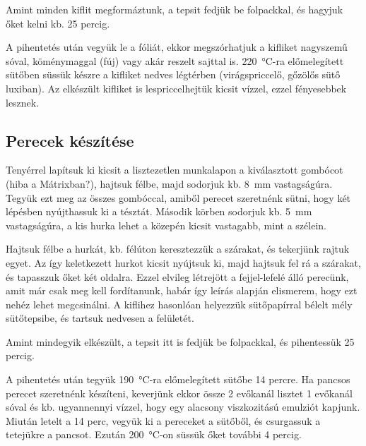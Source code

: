 Amint minden kiflit megformáztunk, a tepsit fedjük be folpackkal, és hagyjuk őket kelni kb. \num{25} percig.

A pihentetés után vegyük le a fóliát, ekkor megszórhatjuk a kifliket nagyszemű sóval, köménymaggal (fúj) vagy akár reszelt sajttal is. \qty{220}{\celsius}-ra előmelegített sütőben süssük készre a kifliket nedves légtérben (virágspriccelő, gőzölős sütő luxiban). Az elkészült kifliket is lespriccelhejtük kicsit vízzel, ezzel fényesebbek lesznek.~\cite{szabi_kifli}

\subsection*{Perecek készítése}
Tenyérrel lapítsuk ki kicsit a lisztezetlen munkalapon a kiválasztott gombócot (hiba a Mátrixban?), hajtsuk félbe, majd sodorjuk kb. \qty{8}{\mm} vastagságúra. Tegyük ezt meg az összes gombóccal, amiből perecet szeretnénk sütni, hogy két lépésben nyújthassuk ki a tésztát. Második körben sodorjuk kb. \qty{5}{\mm} vastagságúra, a kis hurka lehet a közepén kicsit vastagabb, mint a szélein.

Hajtsuk félbe a hurkát, kb. félúton keresztezzük a szárakat, és tekerjünk rajtuk egyet. Az így keletkezett hurkot kicsit nyújtsuk ki, majd hajtsuk fel rá a szárakat, és tapasszuk őket két oldalra. Ezzel elvileg létrejött a fejjel-lefelé álló perecünk, amit már csak meg kell fordítanunk, habár így leírás alapján elismerem, hogy ezt nehéz lehet megcsinálni. A kiflihez hasonlóan helyezzük sütőpapírral bélelt mély sütőtepsibe, és tartsuk nedvesen a felületét.

Amint mindegyik elkészült, a tepsit itt is fedjük be folpackkal, és pihentessük \num{25} percig.

A pihentetés után tegyük \qty{190}{\celsius}-ra előmelegített sütőbe \num{14} percre. Ha pancsos perecet szeretnénk készíteni, keverjünk ekkor össze \num{2} evőkanál lisztet \num{1} evőkanál sóval és kb. ugyannennyi vízzel, hogy egy alacsony viszkozitású emulziót kapjunk. Miután letelt a \num{14} perc, vegyük ki a pereceket a sütőből, és csurgassuk a tetejükre a pancsot. Ezután \qty{200}{\celsius}-on süssük őket további \num{4} percig.~\cite{szabi_perec}
